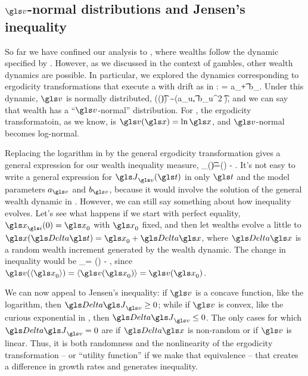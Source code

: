 \subsection{$\gv$-normal distributions and Jensen's inequality}
So far we have confined our analysis to \GBM, where wealths follow the dynamic specified by . However, as we discussed in the context of gambles, other wealth dynamics are possible. In particular, we explored the dynamics corresponding to ergodicity transformations that execute a \BM with drift as in :
\be
\gd\gv = a_\gv \gd\t + b_\gv \gd\gW.
\ee
Under this dynamic, $\gv$ is normally distributed,
\be
\gv(\x(\t)) \sim \mathcal{\N}\left(a_u\t, {b_u}^2 \t\right),
\ee
and we can say that wealth has a ``$\gv$-normal'' distribution. For \GBM, the ergodicity transformatoin, as we know, is $\gv(\x)=\ln \x$, and $\gv$-normal becomes log-normal.

Replacing the logarithm in  by the general ergodicity transformation gives a general expression for our wealth inequality measure,
\be
\J_\gv(\t)=\gv(\ave{\x(\t)}) - \ave{\gv(\x(\t))}.
\ee
It's not easy to write a general expression for $\J_\gv(\t)$ in only $\t$ and the model parameters $a_\gv$ and $b_\gv$, because it would involve the solution of the general wealth dynamic in . However, we can still say something about how inequality evolves. Let's see what happens if we start with perfect equality, $\x_\gi(0)=\x_0$ with $\x_0$ fixed, and then let wealths evolve a little to $\x(\D \t)=\x_0+\D \x$, where $\D \x$ is a random wealth increment generated by the wealth dynamic. The change in inequality would be
\be
\D \J_\gv = \gv() - ,
\ee
since $\gv(\ave{\x_0})=\ave{\gv(\x_0)}=\gv(\x_0)$.

We can now appeal to Jensen's inequality: if $\gv$ is a concave function, like the logarithm, then $\D \J_\gv \geq 0$; while if $\gv$ is convex, like the curious exponential in , then $\D \J_\gv \leq 0$. The only cases for which $\D \J_\gv=0$ are if $\D \x$ is non-random or if $\gv$ is linear. Thus, it is both randomness and the nonlinearity of the ergodicity transformation -- or ``utility function'' if we make that equivalence -- that creates a difference in growth rates and generates inequality.


